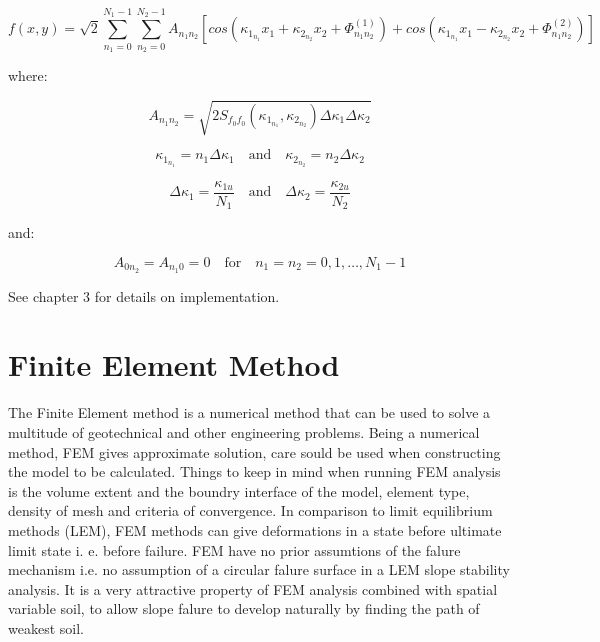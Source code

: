 \begin{equation}
\label{eq114}
	f(x,y) = \sqrt{2}\sum_{n_1=0}^{N_1-1} \sum_{n_2=0}^{N_2-1} A_{n_1 n_2} [cos(\kappa_{1_{n_1}} x_1 + \kappa_{2_{n_2}} x_2 + \Phi_{n_1 n_2}^{(1)}) + cos(\kappa_{1_{n_1}} x_1 - \kappa_{2_{n_2}} x_2 + \Phi_{n_1 n_2}^{(2)}) ]
\end{equation}

where:

\begin{equation}
\label{eq45}
	A_{n_1 n_2} = \sqrt{2S_{f_0 f_0}(\kappa_{1_{n_1}},\kappa_{2_{n_2}})\Delta\kappa_1\Delta\kappa_2}
\end{equation}

\begin{equation}
\label{eq47}
	\kappa_{1_{n_1}} = n_1 \Delta\kappa_1 \quad\text{and}\quad \kappa_{2_{n_2}} = n_2 \Delta\kappa_2
\end{equation}

\begin{equation}
\label{eq48}
	\Delta\kappa_1 = \frac{\kappa_{1u}}{N_1} \quad\text{and}\quad \Delta\kappa_2 = \frac{\kappa_{2u}}{N_2} 
\end{equation}

and:

\begin{equation}
\label{eq49}
	A_{{0}n_2} = A_{{n_1}0} = 0 \quad\text{for}\quad n_1 = n_2 = 0,1,\dots,N_1-1
\end{equation}



See chapter 3 for details on implementation.

\section{Finite Element Method}

The Finite Element method is a numerical method that can be used to solve a multitude of geotechnical and other engineering problems. 
Being a numerical method, FEM gives approximate solution, care sould be used when constructing the model to be calculated. Things to keep in mind when running FEM analysis is the volume extent and the boundry interface of the model, element type, density of mesh and criteria of convergence.
In comparison to limit equilibrium methods (LEM), FEM methods can give deformations in a state before ultimate limit state i. e. before failure. 
FEM have no prior assumtions of the falure mechanism i.e. no assumption of a circular falure surface in a LEM slope stability analysis. It is a very attractive property of FEM analysis combined with spatial variable soil, to allow slope falure to develop naturally by finding the path of weakest soil.

